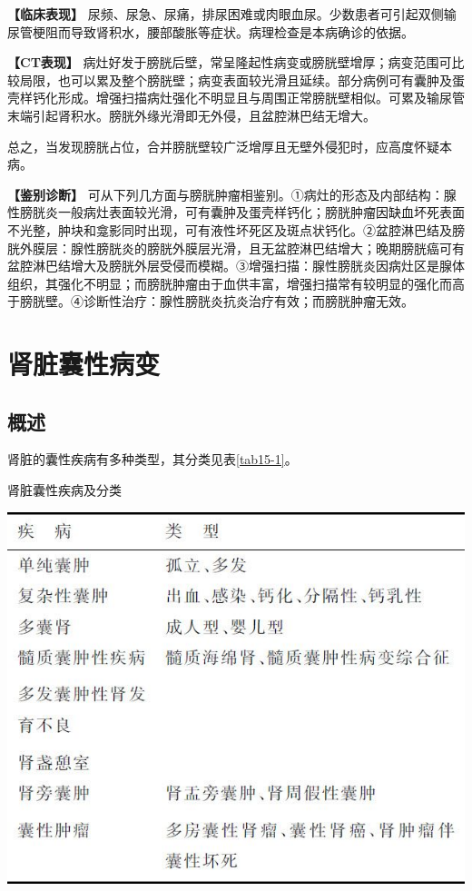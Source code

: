 \textbf{【临床表现】}
尿频、尿急、尿痛，排尿困难或肉眼血尿。少数患者可引起双侧输尿管梗阻而导致肾积水，腰部酸胀等症状。病理检查是本病确诊的依据。

\textbf{【CT表现】}
病灶好发于膀胱后壁，常呈隆起性病变或膀胱壁增厚；病变范围可比较局限，也可以累及整个膀胱壁；病变表面较光滑且延续。部分病例可有囊肿及蛋壳样钙化形成。增强扫描病灶强化不明显且与周围正常膀胱壁相似。可累及输尿管末端引起肾积水。膀胱外缘光滑即无外侵，且盆腔淋巴结无增大。

总之，当发现膀胱占位，合并膀胱壁较广泛增厚且无壁外侵犯时，应高度怀疑本病。

\textbf{【鉴别诊断】}
可从下列几方面与膀胱肿瘤相鉴别。①病灶的形态及内部结构：腺性膀胱炎一般病灶表面较光滑，可有囊肿及蛋壳样钙化；膀胱肿瘤因缺血坏死表面不光整，肿块和龛影同时出现，可有液性坏死区及斑点状钙化。②盆腔淋巴结及膀胱外膜层：腺性膀胱炎的膀胱外膜层光滑，且无盆腔淋巴结增大；晚期膀胱癌可有盆腔淋巴结增大及膀胱外层受侵而模糊。③增强扫描：腺性膀胱炎因病灶区是腺体组织，其强化不明显；而膀胱肿瘤由于血供丰富，增强扫描常有较明显的强化而高于膀胱壁。④诊断性治疗：腺性膀胱炎抗炎治疗有效；而膀胱肿瘤无效。

\section{肾脏囊性病变}

\subsection{概述}

肾脏的囊性疾病有多种类型，其分类见表\ref{tab15-1}。

\begin{table}[htbp]
\centering
\caption{肾脏囊性疾病及分类}
\label{tab15-1}
\includegraphics[width=\textwidth,height=\textheight,keepaspectratio]{./images/Image00330.jpg}
\end{table}

